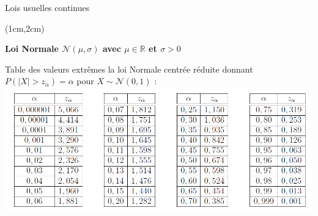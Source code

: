 \documentclass{beamer}
\begin{document}


\begin{frame}{Lois usuelles continues}
\begin{textblock*}{\textwidth}(1cm,2cm)

\begin{center}{\bf \Large Loi Normale $\mathcal{N}(\mu,\sigma)$ avec $\mu\in \mathbb{R}$ et $\sigma>0$} \end{center}

Table des valeurs extrêmes la loi Normale centrée réduite donnant $P(|X|>z_{\alpha})=\alpha$ pour $X\sim \mathcal{N}(0,1)$ : \\

\includegraphics[scale=0.7]{images/table_norm_CR2.png}

\end{textblock*}

\end{frame}
\end{document}
